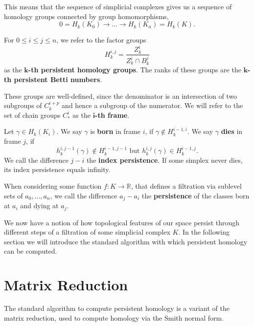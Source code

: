 This means that the sequence of simplicial complexes gives us a sequence of homology groups connected by group homomorphisms, 
\[
0 = H_k(K_0) \rightarrow \dots \rightarrow H_k(K_n) =  H_k(K).
\]

\begin{defi}
For $0 \leq i \leq j \leq n$, we refer to the factor groups \[
    H_k^{i,j} = \frac{Z_k^i}{Z_k^i \cap B_k^{j}}
\] as the \textbf{$\bm{k}$-th persistent homology groups}. The ranks of these groups are the \textbf{$\bm{k}$-th persistent Betti numbers}.
\end{defi}

These groups are well-defined, since the denominator is an intersection of two subgroups of $C_k^{i+p}$ and hence a subgroup of the numerator.
We will refer to the set of chain groups $C_*^i$ as the $\bm{i}$\textbf{-th frame}.

\begin{defi}
Let $\gamma \in H_k(K_i)$. We say $\gamma$ is \textbf{born} in frame $i$, if $\gamma \notin H_k^{i-1,i}$. We say $\gamma$ \textbf{dies} in frame $j$, if 
\[h_k^{i,j-1}(\gamma) \notin H_k^{i-1,j-1} \text{  but  } h_k^{i,j}(\gamma) \in H_k^{i-1,j}.\] 
We call the difference $j-i$ the \textbf{index persistence}. If some simplex never dies, its index persistence equals infinity.
\end{defi}

When considering some function $f: K \rightarrow \mathbb{R}$, that defines a filtration via sublevel sets of $a_0,\dots,a_n$, we call the difference $a_j - a_i$ the \textbf{persistence} of the classes born at $a_i$ and dying at $a_j$.

We now have a notion of how topological features of our space persist through different steps of a filtration of some simplicial complex $K$. In the following section we will introduce the standard algorithm with which persistent homology can be computed. 

\section{Matrix Reduction}
\label{sec:matrix_reduction}
The standard algorithm to compute persistent homology is a variant of the matrix reduction, used to compute homology via the Smith normal form. 


